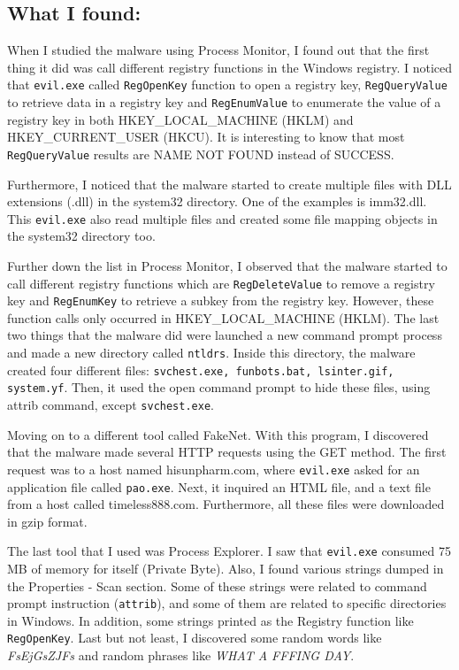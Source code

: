 \documentclass[letterpaper,10pt,titlepage,draftclsnofoot,onecolumn]{IEEEtran}
\begin{document}
\subsection{What I found:}
When I studied the malware using Process Monitor, I found out that the first thing it did was call different registry functions in the Windows registry. 
I noticed that \verb|evil.exe| called \verb|RegOpenKey| function to open a registry key, \verb|RegQueryValue| to retrieve data in a registry key and \verb|RegEnumValue| to enumerate the value of a registry key in both HKEY\_LOCAL\_MACHINE (HKLM) and HKEY\_CURRENT\_USER (HKCU). 
It is interesting to know that most \verb|RegQueryValue| results are NAME NOT FOUND instead of SUCCESS. 

Furthermore, I noticed that the malware started to create multiple files with DLL extensions (.dll) in the system32 directory. 
One of the examples is imm32.dll. 
This \verb|evil.exe| also read multiple files and created some file mapping objects in the system32 directory too.

Further down the list in Process Monitor, I observed that the malware started to call different registry functions which are \verb|RegDeleteValue| to remove a registry key and \verb|RegEnumKey| to retrieve a subkey from the registry key. 
However, these function calls only occurred in HKEY\_LOCAL\_MACHINE (HKLM). 
The last two things that the malware did were launched a new command prompt process and made a new directory called \verb|ntldrs|. 
Inside this directory, the malware created four different files: \verb|svchest.exe, funbots.bat, lsinter.gif, system.yf|. 
Then, it used the open command prompt to hide these files, using attrib command, except \verb|svchest.exe|. 

Moving on to a different tool called FakeNet. 
With this program, I discovered that the malware made several HTTP requests using the GET method. 
The first request was to a host named hisunpharm.com, where \verb|evil.exe| asked for an application file called \verb|pao.exe|. 
Next, it inquired an HTML file, and a text file from a host called timeless888.com. 
Furthermore, all these files were downloaded in gzip format.

The last tool that I used was Process Explorer. 
I saw that \verb|evil.exe| consumed 75 MB of memory for itself (Private Byte). 
Also, I found various strings dumped in the Properties - Scan section. 
Some of these strings were related to command prompt instruction (\verb|attrib|), and some of them are related to specific directories in Windows. 
In addition, some strings printed as the Registry function like \verb|RegOpenKey|. 
Last but not least, I discovered some random words like \textit{FsEjGsZJFs} and random phrases like \textit{WHAT A FFFING DAY}.
\end{document}
